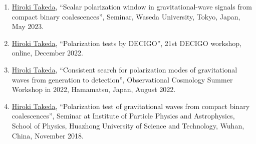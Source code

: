 \documentclass[uplatex, 12pt]{article}
\begin{document}
\begin{enumerate}
\item \uline{Hiroki Takeda}, “Scalar polarization window in gravitational-wave signals from compact binary coalescences”, Seminar, Waseda University, Tokyo, Japan, May 2023.
\item \uline{Hiroki Takeda}, “Polarization tests by DECIGO”, 21st DECIGO workshop, online, December 2022.
\item \uline{Hiroki Takeda}, “Consistent search for polarization modes of gravitational waves from generation to detection”, Observational Cosmology Summer Workshop in 2022, Hamamatsu, Japan, August 2022.
\item \uline{Hiroki Takeda}, “Polarization test of gravitational waves from compact binary coalescences”, Seminar at Institute of Particle Physics and Astrophysics, School of Physics, Huazhong University of Science and Technology, Wuhan, China, November 2018.
\end{enumerate}
\end{document}
